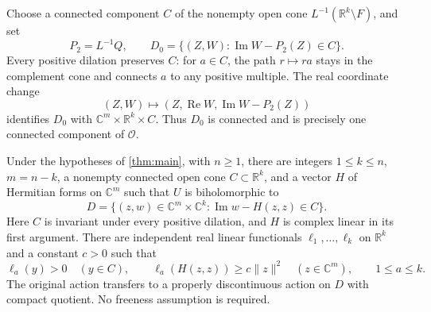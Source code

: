 Choose a connected component $C$ of the nonempty open cone $L^{-1}(\mathbb{R}^k\setminus F)$, and set
\begin{equation}
\label{eq:preliminary-model}
 P_2=L^{-1}Q,\qquad
 D_0=\{(Z,W):\operatorname{Im}W-P_2(Z)\in C\}.
\end{equation}
Every positive dilation preserves $C$: for $a\in C$, the path $r\mapsto ra$ stays in the complement cone and connects $a$ to any positive multiple.  The real coordinate change
\[
 (Z,W)\longmapsto
       (Z,\operatorname{Re}W,\operatorname{Im}W-P_2(Z))
\]
identifies $D_0$ with $\mathbb{C}^m\times\mathbb{R}^k\times C$.  Thus $D_0$ is connected and is precisely one connected component of $\mathcal{O}$.

\begin{theorem}
\label{thm:quadratic-model}
Under the hypotheses of \cref{thm:main}, with $n\ge1$, there are integers $1\le k\le n$, $m=n-k$, a nonempty connected open cone $C\subset\mathbb{R}^k$, and a vector $H$ of Hermitian forms on $\mathbb{C}^m$ such that $U$ is biholomorphic to
\begin{equation}
\label{eq:model}
 D=\{(z,w)\in\mathbb{C}^m\times\mathbb{C}^k:
               \operatorname{Im}w-H(z,z)\in C\}.
\end{equation}
Here $C$ is invariant under every positive dilation, and $H$ is complex linear in its first argument.  There are independent real linear functionals $\ell_1,\ldots,\ell_k$ on $\mathbb{R}^k$ and a constant $c>0$ such that
\begin{equation}
\label{eq:strict-supports}
 \ell_a(y)>0\quad(y\in C),\qquad
 \ell_a(H(z,z))\ge c\lVert z\rVert^2
 \quad(z\in\mathbb{C}^m),\qquad 1\le a\le k.
\end{equation}
The original action transfers to a properly discontinuous action on $D$ with compact quotient.  No freeness assumption is required.
\end{theorem}

